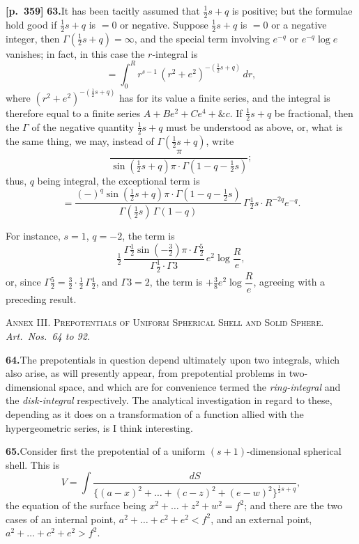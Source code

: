 \documentclass[11pt]{article}
\begin{document}
\bigskip

\noindent\textbf{[p.~359]}\quad
\textbf{63.}\quad It has been tacitly assumed that $\tfrac{1}{2}s+q$ is positive; but the formulae hold good if $\tfrac{1}{2}s+q$ is $=0$ or negative. Suppose $\tfrac{1}{2}s+q$ is $=0$ or a negative integer, then $\Gamma(\tfrac{1}{2}s+q)=\infty$, and the special term involving $e^{-q}$ or $e^{-q}\log e$ vanishes; in fact, in this case the $r$-integral is
\[
= \int_{0}^{R} r^{s-1}\,(r^{2}+e^{2})^{-(\frac{1}{2}s+q)}\,dr,
\]
where $(r^{2}+e^{2})^{-(\frac{1}{2}s+q)}$ has for its value a finite series, and the integral is therefore equal to a finite series $A + Be^{2} + Ce^{4} + \&c$. If $\tfrac{1}{2}s+q$ be fractional, then the $\Gamma$ of the negative quantity $\tfrac{1}{2}s+q$ must be understood as above, or, what is the same thing, we may, instead of $\Gamma(\tfrac{1}{2}s+q)$, write
\[
\frac{\pi}{\sin(\tfrac{1}{2}s+q)\pi\cdot\Gamma(1-q-\tfrac{1}{2}s)};
\]
thus, $q$ being integral, the exceptional term is
\[
= \frac{(-)^{q}\sin(\tfrac{1}{2}s+q)\pi\cdot\Gamma(1-q-\tfrac{1}{2}s)}{\Gamma(\tfrac{1}{2}s)\,\Gamma(1-q)}\,\Gamma\tfrac{1}{2}s \cdot R^{-2q}e^{-q}.
\]

For instance, $s=1$, $q=-2$, the term is
\[
\tfrac{1}{2}\,\frac{\Gamma\tfrac{1}{2}\sin(-\tfrac{3}{2})\pi\cdot\Gamma\tfrac{5}{2}}{\Gamma\tfrac{1}{2}\cdot\Gamma 3}\,e^{2}\log\frac{R}{e},
\]
or, since $\Gamma\tfrac{5}{2} = \tfrac{3}{2}\cdot\tfrac{1}{2}\,\Gamma\tfrac{1}{2}$, and $\Gamma 3 = 2$, the term is $+\tfrac{3}{8}e^{2}\log\dfrac{R}{e}$, agreeing with a preceding result.

\bigskip

\begin{center}
\textsc{Annex III. Prepotentials of Uniform Spherical Shell and Solid Sphere.}\\
\textit{Art.\ Nos.\ 64 to 92.}
\end{center}

\noindent\textbf{64.}\quad The prepotentials in question depend ultimately upon two integrals, which also arise, as will presently appear, from prepotential problems in two-dimensional space, and which are for convenience termed the \emph{ring-integral} and the \emph{disk-integral} respectively. The analytical investigation in regard to these, depending as it does on a transformation of a function allied with the hypergeometric series, is I think interesting.

\bigskip

\noindent\textbf{65.}\quad Consider first the prepotential of a uniform $(s+1)$-dimensional spherical shell. This is
\[
V = \int\frac{dS}{\{(a-x)^{2}+\ldots+(c-z)^{2}+(e-w)^{2}\}^{\frac{1}{2}s+q}},
\]
the equation of the surface being $x^{2}+\ldots+z^{2}+w^{2}=f^{2}$; and there are the two cases of an internal point, $a^{2}+\ldots+c^{2}+e^{2}<f^{2}$, and an external point, $a^{2}+\ldots+c^{2}+e^{2}>f^{2}$.
\end{document}
